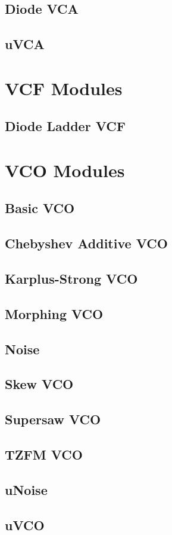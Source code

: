 \documentclass[11pt]{book}
\begin{document}
\section{Diode VCA}
\section{uVCA}

\chapter{VCF Modules}
\section{Diode Ladder VCF}

\chapter{VCO Modules}
\section{Basic VCO}
\section{Chebyshev Additive VCO}
\section{Karplus-Strong VCO}
\section{Morphing VCO}
\section{Noise}
\section{Skew VCO}
\section{Supersaw VCO}
\section{TZFM VCO}
\section{uNoise}
\section{uVCO}
\end{document}
